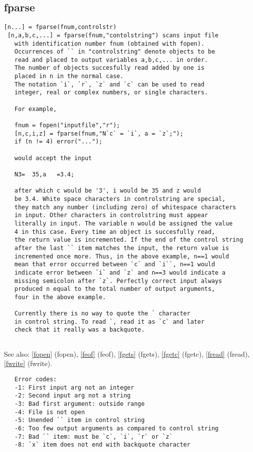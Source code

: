 \documentclass[a4paper]{article}
\begin{document}
\subsection{fparse\label{fparse}}

\begin{tscreen}
\begin{verbatim}
[n...] = fparse(fnum,controlstr)
 [n,a,b,c,...] = fparse(fnum,"contolstring") scans input file
   with identification number fnum (obtained with fopen).
   Occurrences of `` in "controlstring" denote objects to be
   read and placed to output variables a,b,c,... in order.
   The number of objects succesfully read added by one is
   placed in n in the normal case.
   The notation `i`, `r`, `z` and `c` can be used to read
   integer, real or complex numbers, or single characters.

   For example,

   fnum = fopen("inputfile","r");
   [n,c,i,z] = fparse(fnum,"N`c` = `i`, a = `z`;");
   if (n != 4) error("...");

   would accept the input

   N3=  35,a   =3.4;

   after which c would be '3', i would be 35 and z would
   be 3.4. White space characters in controlstring are special,
   they match any number (including zero) of whitespace characters
   in input. Other characters in controlstring must appear
   literally in input. The variable n would be assigned the value
   4 in this case. Every time an object is succesfully read,
   the return value is incremented. If the end of the control string
   after the last `` item matches the input, the return value is
   incremented once more. Thus, in the above example, n==1 would
   mean that error occurred between `c` and `i``, n==1 would
   indicate error between `i` and `z` and n==3 would indicate a
   missing semicolon after `z`. Perfectly correct input always
   produced n equal to the total number of output arguments,
   four in the above example.

   Currently there is no way to quote the ` character
   in control string. To read `, read it as `c` and later
   check that it really was a backquote.
   
\end{verbatim}

See also: \ref{fopen} {(fopen)}, \ref{feof} {(feof)}, \ref{fgets} {(fgets)}, \ref{fgetc} {(fgetc)}, \ref{fread} {(fread)}, \ref{fwrite} {(fwrite)}.
\begin{verbatim}
   Error codes:
   -1: First input arg not an integer
   -2: Second input arg not a string
   -3: Bad first argument: outside range
   -4: File is not open
   -5: Unended `` item in control string
   -6: Too few output arguments as compared to control string
   -7: Bad `` item: must be `c`, `i`, `r` or `z`
   -8: `x` item does not end with backquote character
\end{verbatim}
\end{tscreen}
\end{document}
